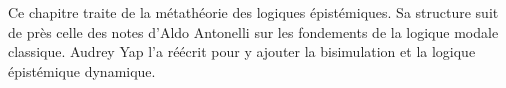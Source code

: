 \documentclass[../../../include/open-logic-chapter]{subfiles}
\begin{document}

Ce chapitre traite de la métathéorie des logiques épistémiques.
Sa structure suit de près celle des notes d'Aldo Antonelli sur les
fondements de la logique modale classique. Audrey Yap l'a réécrit
pour y ajouter la bisimulation et la logique épistémique dynamique.


\OLEndChapterHook
\end{document}

